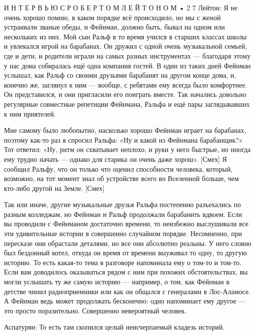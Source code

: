 \documentclass[10pt,oneside]{article}
\begin{document}
И Н Т Е Р В Ь Ю   С   Р О Б Е Р Т О М   Л Е Й Т О Н О М • 2 7 Лейтон: Я не очень хорошо помню, в каком порядке всё происходило, но мы с женой устраивали званые обеды, и Фейнман, должно быть, бывал на одном или нескольких из них. Мой сын Ральф в то время учился в старших классах школы и увлекался игрой на барабанах. Он дружил с одной очень музыкальной семьей, где и дети, и родители играли на самых разных инструментах --- благодаря этому у нас дома собиралась ещё одна компания гостей. В один из таких дней Фейнман услышал, как Ральф со своими друзьями барабанят на другом конце дома, и, конечно же, заглянул к ним --- вообще, с ребятами ему всегда было комфортнее. Он представился, и они пригласили его поиграть вместе. Так начались довольно регулярные совместные репетиции Фейнмана, Ральфа и ещё пары заглядывавших к ним приятелей.\par

Мне самому было любопытно, насколько хорошо Фейнман играет на барабанах, поэтому как-то раз я спросил Ральфа: «Ну и какой из Фейнмана барабанщик?» Тот ответил: «Ну, ритм он схватывает неплохо, и руки у него быстрые, но иногда ему трудно начать --- однако для старика он очень даже хорош». [Смех] Я сообщил Ральфу, что он только что оценил способности человека, который, возможно, на тот момент знал об устройстве всего во Вселенной больше, чем кто-либо другой на Земле. [Смех]\par

Так или иначе, другие музыкальные друзья Ральфа постепенно разъехались по разным колледжам, но Фейнман и Ральф продолжали барабанить вдвоем. Если вы проводили с Фейнманом достаточно времени, то неизбежно выслушивали все эти удивительные истории в совершенно случайном порядке. Несомненно, при пересказе они обрастали деталями, но все они абсолютно реальны. У него словно был бездонный котел, откуда он время от времени выуживал то одну, то другую историю. То есть какая-то тема в разговоре напоминала ему о том-то и том-то. Если вам доводилось оказываться рядом с ним при похожих обстоятельствах, вы могли услышать ту же самую историю --- например, о том, как Фейнман в детстве чинил радиоприемники или как он общался с генералами в Лос-Аламосе. А Фейнман ведь может продолжать бесконечно: одно напоминает ему другое --- это просто поразительно. Совершенно невероятный человек.\par

Аспатурян: То есть там скопился целый неисчерпаемый кладезь историй.\par
\end{document}
